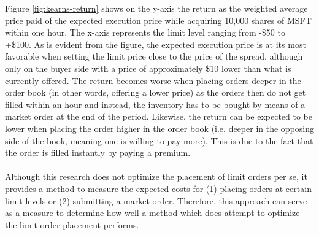 Figure \ref{fig:kearns-return} shows on the y-axis the return as the weighted average price paid of the expected execution price while acquiring 10,000 shares of MSFT within one hour.
The x-axis represents the limit level ranging from -\$50 to +\$100.
As is evident from the figure, the expected execution price is at its most favorable when setting the limit price close to the price of the spread, although only on the buyer side with a price of approximately \$10 lower than what is currently offered.
The return becomes worse when placing orders deeper in the order book (in other words, offering a lower price) as the orders then do not get filled within an hour and instead, the inventory has to be bought by means of a market order at the end of the period.
Likewise, the return can be expected to be lower when placing the order higher in the order book (i.e. deeper in the opposing side of the book, meaning one is willing to pay more).
This is due to the fact that the order is filled instantly by paying a premium.
\\
\\
Although this research does not optimize the placement of limit orders per se, it provides a method to measure the expected costs for (1) placing orders at certain limit levels or (2) submitting a market order.
Therefore, this approach can serve as a measure to determine how well a method which does attempt to optimize the limit order placement performs.

